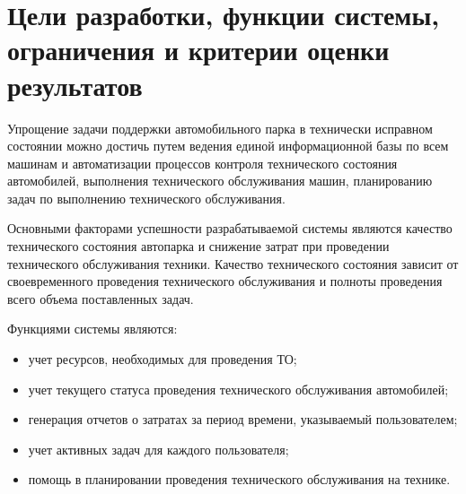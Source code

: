 \section{Цели разработки, функции системы, ограничения и критерии оценки
результатов}

Упрощение задачи поддержки автомобильного парка в технически исправном состоянии
можно достичь путем ведения единой информационной базы по всем машинам и
автоматизации процессов контроля технического состояния автомобилей, выполнения
технического обслуживания машин, планированию задач по выполнению технического
обслуживания.

Основными факторами успешности разрабатываемой системы являются качество
технического состояния автопарка и снижение затрат при проведении технического
обслуживания техники. Качество технического состояния зависит от своевременного
проведения технического обслуживания и полноты проведения всего объема
поставленных задач.

Функциями системы являются:
\begin{itemize}

	\item учет ресурсов, необходимых для проведения ТО;

    \item учет текущего статуса проведения технического обслуживания
        автомобилей;

    \item генерация отчетов о затратах за период времени, указываемый
        пользователем;

    \item учет активных задач для каждого пользователя;

    \item помощь в планировании проведения технического обслуживания на технике.

\end{itemize}
